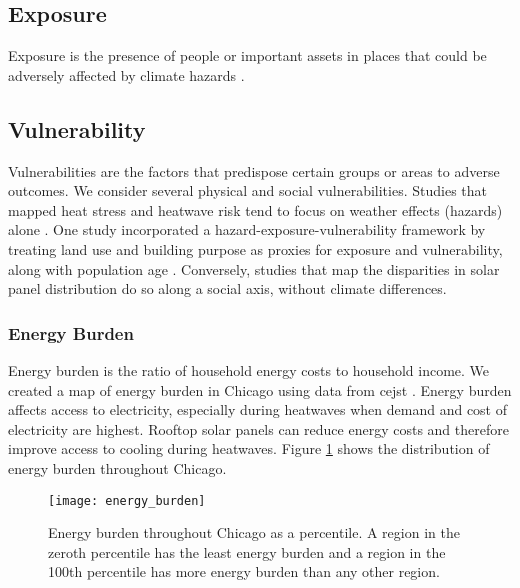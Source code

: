 \subsection{Exposure}

Exposure is the presence of people or important assets in places that could be
adversely affected by climate hazards \cite{viner_understanding_2020}.

\subsection{Vulnerability}

Vulnerabilities are the factors that predispose certain groups or areas to adverse
outcomes. We consider several physical and social vulnerabilities. Studies that
mapped heat stress and heatwave risk tend to focus on weather effects (hazards)
alone \cite{dahl_killer_2019, kang_heatwave-related_2020,mazdiyasni_heat_2019,
cotlier_extreme_2022}. One study incorporated a hazard-exposure-vulnerability
framework by treating land use and building purpose as proxies for exposure and
vulnerability, along with population age \cite{maragno_mapping_2020}. Conversely,
studies that map the disparities in solar panel distribution do so along a social
axis, without climate differences.


\subsubsection{Energy Burden}

Energy burden is the ratio of household energy costs to household income. We created
a map of energy burden in Chicago using data from \ac{cejst}
\cite{council_on_environmental_quality_climate_nodate}. Energy
burden affects access to electricity, especially during heatwaves when demand
and cost of electricity are highest. Rooftop solar panels can reduce energy costs
and therefore improve access to cooling during heatwaves. Figure \ref{fig:eb} shows
the distribution of energy burden throughout Chicago.

\begin{figure}[H]
  \label{fig:eb}
    \begin{center}
      \texttt{[image: energy\_burden]}
      \vspace*{-2cm}
      \caption{Energy burden throughout Chicago as a percentile. A region in the zeroth
      percentile has the least energy burden and a region in the 100th percentile has
      more energy burden than any other region.}
    \end{center}
\end{figure}

